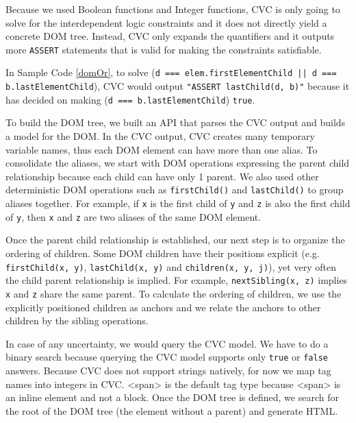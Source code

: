 Because we used Boolean functions and Integer functions, CVC is only going to solve for the interdependent logic constraints and it does not directly yield a concrete DOM tree.  
Instead, CVC only expands the quantifiers and it outputs more {\tt ASSERT} statements that is valid for making the constraints satisfiable.  

In Sample Code \ref{domOr}, to solve ({\tt d === elem.firstElementChild || d === b.lastElementChild}), CVC would output {\tt "ASSERT lastChild(d, b)"} because it has decided on making ({\tt d === b.lastElementChild}) {\tt true}.

To build the DOM tree, we built an API that parses the CVC output and builds a model for the DOM.  
In the CVC output, CVC creates many temporary variable names, thus each DOM element can have more than one alias.  
To consolidate the aliases, we start with DOM operations expressing the parent child relationship because each child can have only 1 parent.  
We also used other deterministic DOM operations such as {\tt firstChild()} and {\tt lastChild()} to group aliases together.  
For example, if {\tt x} is the first child of {\tt y} and {\tt z} is also the first child of {\tt y}, then {\tt x} and {\tt z} are two aliases of the same DOM element.  

Once the parent child relationship is established, our next step is to organize the ordering of children.  
Some DOM children have their positions explicit (e.g. {\tt firstChild(x, y)}, {\tt lastChild(x, y)} and {\tt children(x, y, j)}), yet very often the child parent relationship is implied.  For example, {\tt nextSibling(x, z)} implies {\tt x} and {\tt z} share the same parent.  
To calculate the ordering of children, we use the explicitly positioned children as anchors and we relate the anchors to other children by the sibling operations.  

In case of any uncertainty, we would query the CVC model.  We have to do a binary search because querying the CVC model supports only {\tt true} or {\tt false} answers.  
Because CVC does not support strings natively, for now we map tag names into integers in CVC.  <span> is the default tag type because <span> is an inline element and not a block.
Once the DOM tree is defined, we search for the root of the DOM tree (the element without a parent) and generate HTML.  


